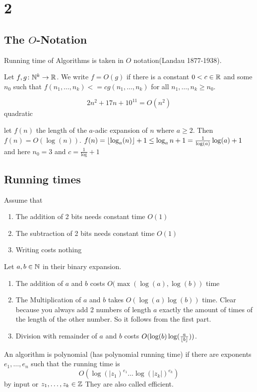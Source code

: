 \chapter{2}
\section{The \(O\)-Notation}
Running time of Algorithms is taken in \(O\) notation(Landau 1877-1938).
\begin{Def} Let \(f,g\colon \mathbb{N}^k\to\mathbb{R}\). We write 
\(f=O(g)\) if there is a constant \(0<c\in\mathbb{R}\) and some \(n_0\) such that \(f(n_1,\dots,n_k)<=cg(n_1,\dots,n_k)\) for all \(n_1,\dots,n_k\geq n_0\).
\end{Def}
\begin{Bsp} \[2n^2+17n+10^{11}=O(n^2)\] quadratic 
\end{Bsp}
\begin{Bsp}
let \(f(n)\) the length of the \(a\)-adic expansion of \(n\) where \(a\geq 2\).
Then \(f(n)=O(\log(n))\).
\(f(n)=\lfloor\log_a(n)\rfloor+1\leq \log_an+1=\frac{1}{\log(a)}\log(a)+1\) and here \(n_0=3\) and \(c=\frac{1}{\log }+1\)
\end{Bsp}

\section{Running times}
Assume that 
\begin{enumerate}
\item The addition of 2 bits needs constant time \(O(1)\)
\item The subtraction of 2 bits needs constant time \(O(1)\)
\item Writing costs nothing
\end{enumerate}
\begin{Lemma}
Let \(a,b\in\mathbb{N}\) in their binary expansion. 
\begin{enumerate}
\item The addition of \(a\) and \(b\) costs \(O(\max(\log(a),\log(b))\) time
\item The Multiplication of \(a\) and \(b\) takes \(O(\log(a)\log(b))\) time. Clear because you always add 2 numbers of length \(a\) exactly the amount of times of the length of the other number. So it follows from the first part.
\item Division with remainder of \(a\) and \(b\) costs \(O(\log(b)\log(\frac{a}{\lfloor b\rfloor}))\).
\end{enumerate}
\end{Lemma}
\begin{Def} An algorithm is polynomial (has polynomial running time) if there are exponents \(e_1,\dots,e_n\) such that the running time is \[O(\log(|z_1)^{e_1}\dots\log(|z_k|)^{e_k})\] by input or \(z_1,\dots,z_k\in \mathbb{Z}\) They are also called efficient.
\end{Def}

